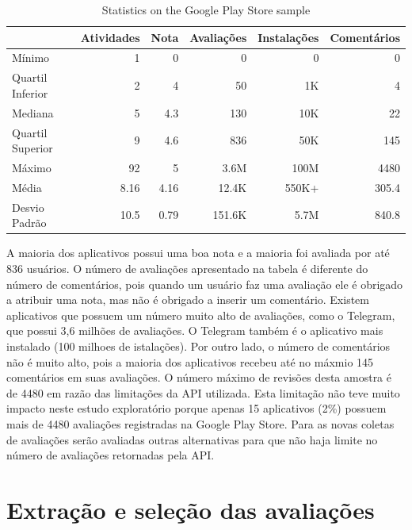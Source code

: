 \begin{table}[htb]

\centering
\caption{Statistics on the Google Play Store sample}
\small
\label{tab:summarygps}
\begin{tabular}{lrrrrr}
\hline
             & Atividades & Nota & Avaliações     & Instalações  & Comentários \\
\hline
Mínimo          & 1          & 0     & 0            & 0         & 0       \\
Quartil Inferior           & 2          & 4           & 50    & 1K      & 4       \\
Mediana       & 5          & 4.3   & 130         & 10K     & 22      \\
Quartil Superior          & 9          & 4.6   & 836        & 50K     & 145     \\
Máximo          & 92         & 5     & 3.6M    & 100M & 4480    \\
Média         & 8.16       & 4.16  & 12.4K     & 550K+    & 305.4   \\
Desvio Padrão        & 10.5       & 0.79  & 151.6K  & 5.7M   & 840.8  \\
\hline
\end{tabular}
\end{table}

A maioria dos aplicativos possui uma boa nota e a maioria foi avaliada por até 836 usuários. O número de avaliações apresentado na tabela é diferente do número de comentários, pois quando um usuário faz uma avaliação ele é obrigado a atribuir uma nota, mas não é obrigado a inserir um comentário. Existem aplicativos que possuem um número muito alto de avaliações, como o Telegram, que possui 3,6 milhões de avaliações. O Telegram também é o aplicativo mais instalado (100 milhoes de istalações).
Por outro lado, o número de comentários não é muito alto, pois a maioria dos aplicativos recebeu até no máxmio 145 comentários em suas avaliações. O número máximo de revisões desta amostra é de 4480 em razão das limitações da API utilizada. Esta limitação não teve muito impacto neste estudo exploratório porque apenas 15 aplicativos (2\%) possuem mais de 4480 avaliações registradas na Google Play Store. 
Para as novas coletas de avaliações serão avaliadas outras alternativas para que não haja limite no número de avaliações retornadas pela API. 


\section{Extração e seleção das avaliações}
\label{sec:extracaoselecao}

